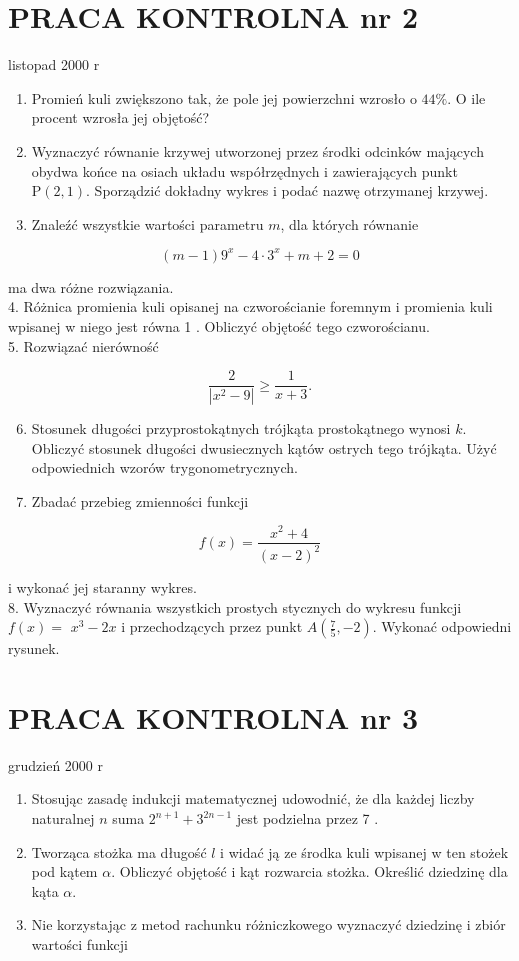 \documentclass[10pt]{article}
\begin{document}
\section*{PRACA KONTROLNA nr 2}
listopad 2000 r

\begin{enumerate}
  \item Promień kuli zwiększono tak, że pole jej powierzchni wzrosło o $44 \%$. O ile procent wzrosła jej objętość?
  \item Wyznaczyć równanie krzywej utworzonej przez środki odcinków mających obydwa końce na osiach układu współrzędnych i zawierających punkt $\mathrm{P}(2,1)$. Sporządzić dokładny wykres i podać nazwę otrzymanej krzywej.
  \item Znaleźć wszystkie wartości parametru $m$, dla których równanie
\end{enumerate}

$$
(m-1) 9^{x}-4 \cdot 3^{x}+m+2=0
$$

ma dwa różne rozwiązania.\\
4. Różnica promienia kuli opisanej na czworościanie foremnym i promienia kuli wpisanej w niego jest równa 1 . Obliczyć objętość tego czworościanu.\\
5. Rozwiązać nierówność

$$
\frac{2}{\left|x^{2}-9\right|} \geqslant \frac{1}{x+3} .
$$

\begin{enumerate}
  \setcounter{enumi}{5}
  \item Stosunek długości przyprostokątnych trójkąta prostokątnego wynosi $k$. Obliczyć stosunek długości dwusiecznych kątów ostrych tego trójkąta. Użyć odpowiednich wzorów trygonometrycznych.
  \item Zbadać przebieg zmienności funkcji
\end{enumerate}

$$
f(x)=\frac{x^{2}+4}{(x-2)^{2}}
$$

i wykonać jej staranny wykres.\\
8. Wyznaczyć równania wszystkich prostych stycznych do wykresu funkcji $f(x)=$ $x^{3}-2 x$ i przechodzących przez punkt $A\left(\frac{7}{5},-2\right)$. Wykonać odpowiedni rysunek.

\section*{PRACA KONTROLNA nr 3}
grudzień 2000 r

\begin{enumerate}
  \item Stosując zasadę indukcji matematycznej udowodnić, że dla każdej liczby naturalnej $n$ suma $2^{n+1}+3^{2 n-1}$ jest podzielna przez 7 .
  \item Tworząca stożka ma długość $l$ i widać ją ze środka kuli wpisanej w ten stożek pod kątem $\alpha$. Obliczyć objętość i kąt rozwarcia stożka. Określić dziedzinę dla kąta $\alpha$.
  \item Nie korzystając z metod rachunku różniczkowego wyznaczyć dziedzinę i zbiór wartości funkcji
\end{enumerate}
\end{document}
